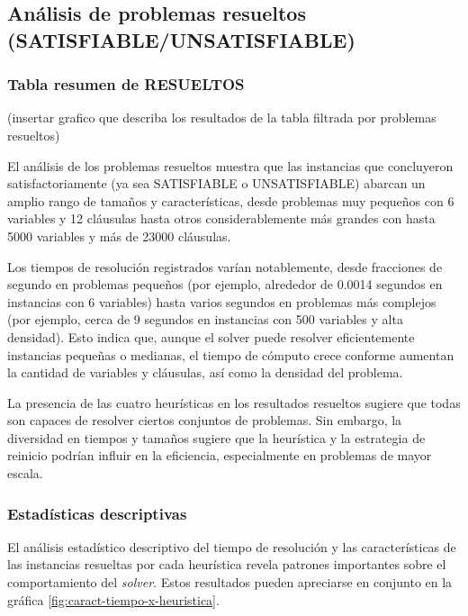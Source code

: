 \subsection{An\'alisis de problemas resueltos (SATISFIABLE/UNSATISFIABLE)}

\subsubsection{Tabla resumen de RESUELTOS}
(insertar grafico que describa los resultados de la tabla filtrada por problemas resueltos)

El análisis de los problemas resueltos muestra que las instancias que concluyeron satisfactoriamente (ya sea SATISFIABLE o UNSATISFIABLE) abarcan un amplio rango de tamaños y características, desde problemas muy pequeños con 6 variables y 12 cláusulas hasta otros considerablemente más grandes con hasta 5000 variables y más de 23000 cláusulas.

Los tiempos de resolución registrados varían notablemente, desde fracciones de segundo en problemas pequeños (por ejemplo, alrededor de 0.0014 segundos en instancias con 6 variables) hasta varios segundos en problemas más complejos (por ejemplo, cerca de 9 segundos en instancias con 500 variables y alta densidad). Esto indica que, aunque el solver puede resolver eficientemente instancias pequeñas o medianas, el tiempo de cómputo crece conforme aumentan la cantidad de variables y cláusulas, así como la densidad del problema.

La presencia de las cuatro heurísticas en los resultados resueltos sugiere que todas son capaces de resolver ciertos conjuntos de problemas. Sin embargo, la diversidad en tiempos y tamaños sugiere que la heurística y la estrategia de reinicio podrían influir en la eficiencia, especialmente en problemas de mayor escala.

\subsubsection{Estad\'isticas descriptivas}


El análisis estadístico descriptivo del tiempo de resolución y las características de las instancias resueltas por cada heurística revela patrones importantes sobre el comportamiento del \textit{solver}. Estos resultados pueden apreciarse en conjunto en la gr\'afica \ref{fig:caract-tiempo-x-heuristica}.

